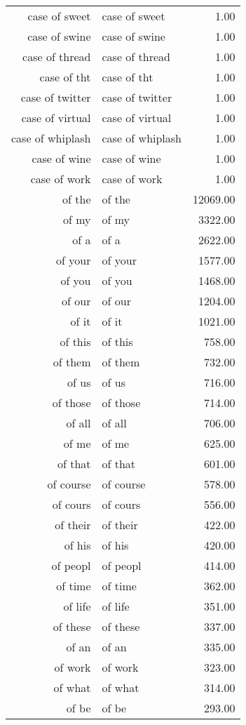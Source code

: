 \begin{table}[ht]
\begin{tabular}{rlr}
  case of sweet & case of sweet & 1.00 \\ 
  case of swine & case of swine & 1.00 \\ 
  case of thread & case of thread & 1.00 \\ 
  case of tht & case of tht & 1.00 \\ 
  case of twitter & case of twitter & 1.00 \\ 
  case of virtual & case of virtual & 1.00 \\ 
  case of whiplash & case of whiplash & 1.00 \\ 
  case of wine & case of wine & 1.00 \\ 
  case of work & case of work & 1.00 \\ 
  of the & of the & 12069.00 \\ 
  of my & of my & 3322.00 \\ 
  of a & of a & 2622.00 \\ 
  of your & of your & 1577.00 \\ 
  of you & of you & 1468.00 \\ 
  of our & of our & 1204.00 \\ 
  of it & of it & 1021.00 \\ 
  of this & of this & 758.00 \\ 
  of them & of them & 732.00 \\ 
  of us & of us & 716.00 \\ 
  of those & of those & 714.00 \\ 
  of all & of all & 706.00 \\ 
  of me & of me & 625.00 \\ 
  of that & of that & 601.00 \\ 
  of course & of course & 578.00 \\ 
  of cours & of cours & 556.00 \\ 
  of their & of their & 422.00 \\ 
  of his & of his & 420.00 \\ 
  of peopl & of peopl & 414.00 \\ 
  of time & of time & 362.00 \\ 
  of life & of life & 351.00 \\ 
  of these & of these & 337.00 \\ 
  of an & of an & 335.00 \\ 
  of work & of work & 323.00 \\ 
  of what & of what & 314.00 \\ 
  of be & of be & 293.00 \\ 

\end{tabular}
\end{table}
